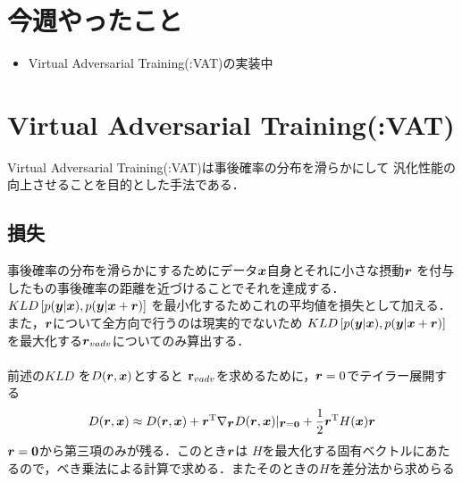 \documentclass[twocolumn]{jarticle}     %
\begin{document}


\section{今週やったこと}
\begin{itemize}
 	\item Virtual Adversarial Training(:VAT)の実装中
\end{itemize}


\section{Virtual Adversarial Training(:VAT)}
Virtual Adversarial Training(:VAT)は事後確率の分布を滑らかにして
汎化性能の向上させることを目的とした手法である．\\

\subsection{損失}
事後確率の分布を滑らかにするためにデータ$\mbox{\boldmath $x$}$自身とそれに小さな摂動$\mbox{\boldmath $r$}$
を付与したもの事後確率の距離を近づけることでそれを達成する．
$KLD\left[ p(\mbox{\boldmath $y$}|\mbox{\boldmath $x$}),p(\mbox{\boldmath $y$}|\mbox{\boldmath $x$}+\mbox{\boldmath $r$})\right]$
を最小化するためこれの平均値を損失として加える．\\
また，$\mbox{\boldmath $r$}$について全方向で行うのは現実的でないため
$KLD\left[ p(\mbox{\boldmath $y$}|\mbox{\boldmath $x$}),p(\mbox{\boldmath $y$}|\mbox{\boldmath $x$}+\mbox{\boldmath $r$})\right]$
を最大化する$\mbox{\boldmath $r$}_{vadv}$についてのみ算出する．\\
\\
前述の$KLD$
を$D(\mbox{\boldmath $r$},\mbox{\boldmath $x$})$とすると
${\bf r}_{vadv}$を求めるために，$\mbox{\boldmath $r$}=0$でテイラー展開する
\begin{eqnarray}
	D(\mbox{\boldmath $r$},\mbox{\boldmath $x$})\approx
	D(\mbox{\boldmath $r$},\mbox{\boldmath $x$})+\mbox{\boldmath $r$}^{\rm T} 
	\nabla _{\mbox{\boldmath $r$}}	D(\mbox{\boldmath $r$},\mbox{\boldmath $x$})|_{\mbox{\boldmath $r$}={\bf 0}}
	+\frac{1}{2}\mbox{\boldmath $r$}^{\rm T}H(\mbox{\boldmath $x$})\mbox{\boldmath $r$}
\end{eqnarray}
$\mbox{\boldmath $r$}={\bf 0}$から第三項のみが残る．このとき$\mbox{\boldmath $r$}$は
$H$を最大化する固有ベクトルにあたるので，べき乗法による計算で求める．またそのときの$H$を差分法から求めらる
\end{document}
